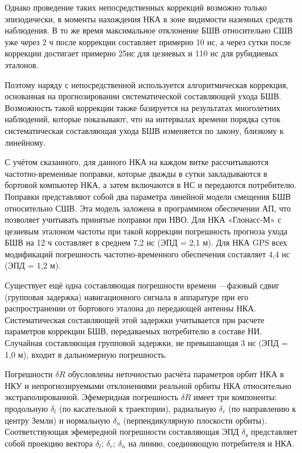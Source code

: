 \documentclass[14pt,a4paper,oneside]{extarticle}
\begin{document}
Однако проведение таких непосредственных коррекций возможно только эпизодически, в моменты нахождения НКА в зоне видимости наземных средств наблюдения. В то же время максимальное отклонение БШВ относительно СШВ уже через 2 ч после коррекции составляет примерно 10 нс, а через сутки после коррекции достигает примерно 25нс для цезиевых и 110 нс для рубидиевых эталонов.

Поэтому наряду с непосредственной используется алгоритмическая коррекция, основанная на прогнозировании систематической составляющей ухода БШВ. Возможность такой коррекции также базируется на результатах многолетних наблюдений, которые показывают, что на интервалах времени порядка суток систематическая составляющая ухода БШВ изменяется по закону, близкому к линейному.

С учётом сказанного, для данного НКА на каждом витке рассчитываются частотно-временные поправки, которые дважды в сутки закладываются в бортовой компьютер НКА, а затем включаются в НС и передаются потребителю. Поправки представляют собой два параметра линейной модели смещения БШВ относительно СШВ. Эта модель заложена в программном обеспечении АП, что позволяет учитывать принятые поправки при НВО. Для НКА «Глонасс-М» с цезиевым эталоном частоты при такой коррекции погрешность прогноза ухода БШВ на 12 ч составляет в среднем 7,2 нс (ЭПД = 2,1 м). Для НКА GPS всех модификаций погрешность частотно-временного обеспечения составляет 4,4 нс (ЭПД = 1,2 м).

Существует ещё одна составляющая погрешности времени ––фазовый сдвиг (групповая задержка) навигационного сигнала в аппаратуре при его распространении от бортового эталона до передающей антенны НКА. Систематическая составляющей этой задержки учитывается при расчете параметров коррекции БШВ, передаваемых потребителю в составе НИ. Случайная составляющая групповой задержки, не превышающая 3 нс (ЭПД = 1,0 м), входит в дальномерную погрешность.

Погрешности $\delta R$ обусловлены неточностью расчёта параметров орбит НКА в НКУ и непрогнозируемыми отклонениями реальной орбиты НКА относительно экстраполированной. Эфемеридная погрешность $\delta R$ имеет три компоненты: продольную $\delta_{l}$ (по касательной к траектории), радиальную $\delta_{r}$ (по направлению к центру Земли) и нормальную $\delta_{n}$ (перпендикулярную плоскости орбиты). Соответствующая эфемередной погрешности составляющая ЭПД $\delta_{\text{э}}$ представляет собой проекцию вектора {$\delta_{l}$; $\delta_{r}$; $\delta_{n}$} на линию, соединяющую потребителя и НКА.
\end{document}
